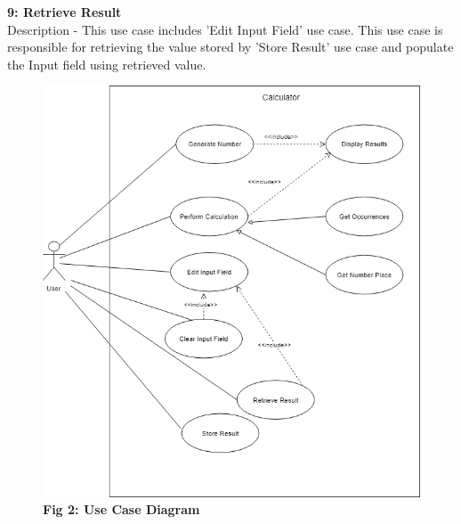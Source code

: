 \documentclass[paper=a4, fontsize=11pt]{report}
\numberwithin{equation}{section}		%
\numberwithin{figure}{section}			%
\numberwithin{table}{section}				%
\begin{document}
\begin{flushleft}
\textbf{9: Retrieve Result}
\\Description - This use case includes 'Edit Input Field' use case. This use case is responsible for retrieving the value stored by 'Store Result' use case and populate the Input field using retrieved value. 
\end{flushleft}

\pagebreak
\begin{figure}[htp]
    \centering
    \vspace{2cm}
    \includegraphics[width=15cm]{UseCaseDiagram.png}
    \caption*{\textbf{Fig 2: Use Case Diagram}}
\end{figure}
\end{document}
